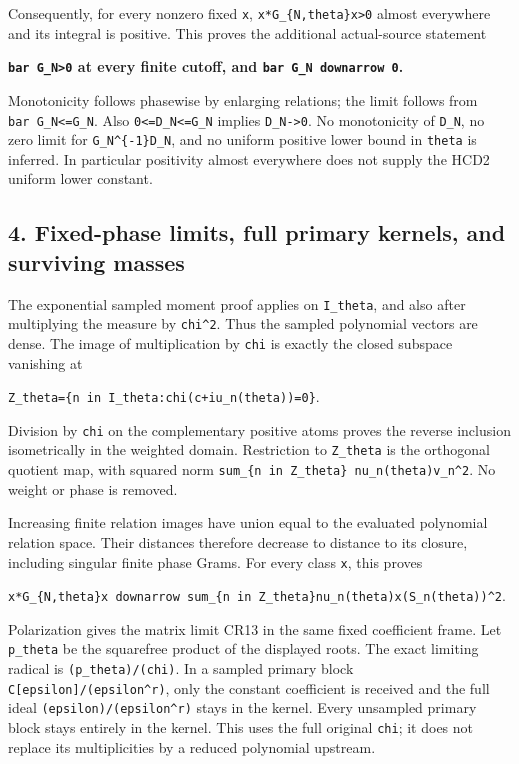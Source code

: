 Consequently, for every nonzero fixed \texttt{x}, \texttt{x*G\_\{N,theta\}x\textgreater{}0} almost everywhere and its integral is positive. This proves the additional actual-source statement

\textbf{\texttt{bar\ G\_N\textgreater{}0} at every finite cutoff, and \texttt{bar\ G\_N\ downarrow\ 0}.}

Monotonicity follows phasewise by enlarging relations; the limit follows from \texttt{bar\ G\_N\textless{}=G\_N}. Also \texttt{0\textless{}=D\_N\textless{}=G\_N} implies \texttt{D\_N-\textgreater{}0}. No monotonicity of \texttt{D\_N}, no zero limit for \texttt{G\_N\^{}\{-1\}D\_N}, and no uniform positive lower bound in \texttt{theta} is inferred. In particular positivity almost everywhere does not supply the HCD2 uniform lower constant.

\subsection{4. Fixed-phase limits, full primary kernels, and surviving masses}\label{fixed-phase-limits-full-primary-kernels-and-surviving-masses}

The exponential sampled moment proof applies on \texttt{I\_theta}, and also after multiplying the measure by \texttt{\textbar{}chi\textbar{}\^{}2}. Thus the sampled polynomial vectors are dense. The image of multiplication by \texttt{chi} is exactly the closed subspace vanishing at

\texttt{Z\_theta=\{n\ in\ I\_theta:chi(c+iu\_n(theta))=0\}}.

Division by \texttt{chi} on the complementary positive atoms proves the reverse inclusion isometrically in the weighted domain. Restriction to \texttt{Z\_theta} is the orthogonal quotient map, with squared norm \texttt{sum\_\{n\ in\ Z\_theta\}\ nu\_n(theta)\textbar{}v\_n\textbar{}\^{}2}. No weight or phase is removed.

Increasing finite relation images have union equal to the evaluated polynomial relation space. Their distances therefore decrease to distance to its closure, including singular finite phase Grams. For every class \texttt{x}, this proves

\texttt{x*G\_\{N,theta\}x\ downarrow\ sum\_\{n\ in\ Z\_theta\}nu\_n(theta)\textbar{}x(S\_n(theta))\textbar{}\^{}2}.

Polarization gives the matrix limit CR13 in the same fixed coefficient frame. Let \texttt{p\_theta} be the squarefree product of the displayed roots. The exact limiting radical is \texttt{(p\_theta)/(chi)}. In a sampled primary block \texttt{C{[}epsilon{]}/(epsilon\^{}r)}, only the constant coefficient is received and the full ideal \texttt{(epsilon)/(epsilon\^{}r)} stays in the kernel. Every unsampled primary block stays entirely in the kernel. This uses the full original \texttt{chi}; it does not replace its multiplicities by a reduced polynomial upstream.

